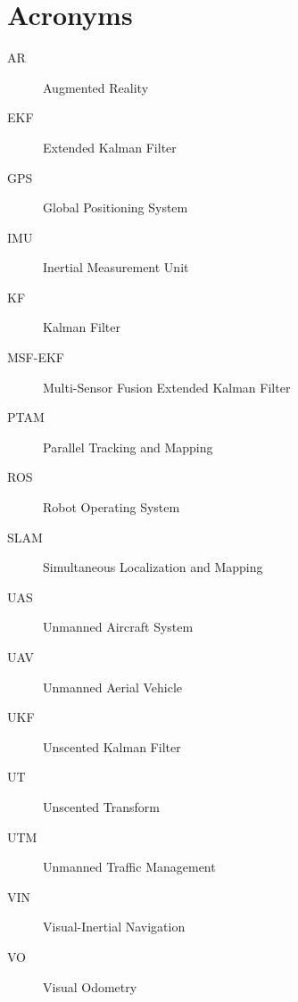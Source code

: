 \chapter*{Acronyms}

\begin{description}
\item [AR] Augmented Reality
\item [EKF] Extended Kalman Filter
\item [GPS] Global Positioning System
\item [IMU] Inertial Measurement Unit
\item [KF] Kalman Filter
\item [MSF-EKF] Multi-Sensor Fusion Extended Kalman Filter
\item [PTAM] Parallel Tracking and Mapping
\item [ROS] Robot Operating System
\item [SLAM] Simultaneous Localization and Mapping
\item [UAS] Unmanned Aircraft System
\item [UAV] Unmanned Aerial Vehicle
\item [UKF] Unscented Kalman Filter
\item [UT] Unscented Transform
\item [UTM] Unmanned Traffic Management
\item [VIN] Visual-Inertial Navigation
\item [VO] Visual Odometry
\end{description}